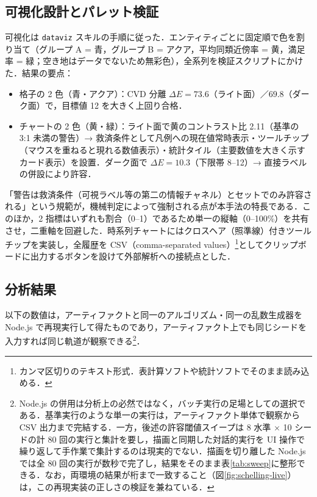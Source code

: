 \documentclass[a4paper]{jlreq}
\begin{document}
\subsection{可視化設計とパレット検証}\label{sec:palette}

可視化は \texttt{dataviz} スキルの手順に従った．エンティティごとに固定順で色を割り当て（グループ A = 青，グループ B = アクア，平均同類近傍率 = 黄，満足率 = 緑；空き地はデータでないため無彩色），全系列を検証スクリプトにかけた．結果の要点：

\begin{itemize}
  \item 格子の 2 色（青・アクア）：CVD 分離 $\Delta E = 73.6$（ライト面）／$69.8$（ダーク面）で，目標値 12 を大きく上回り合格．
  \item チャートの 2 色（黄・緑）：ライト面で黄のコントラスト比 2.11（基準の 3:1 未満の警告）→ 救済条件として凡例への現在値常時表示・ツールチップ（マウスを重ねると現れる数値表示）・統計タイル（主要数値を大きく示すカード表示）を設置．ダーク面で $\Delta E = 10.3$（下限帯 8--12）→ 直接ラベルの併設により許容．
\end{itemize}

「警告は救済条件（可視ラベル等の第二の情報チャネル）とセットでのみ許容される」という規範が，機械判定によって強制される点が本手法の特長である．このほか，2 指標はいずれも割合（0--1）であるため単一の縦軸（0--100\%）を共有させ，二重軸を回避した．時系列チャートにはクロスヘア（照準線）付きツールチップを実装し，全履歴を CSV（comma-separated values）\footnote{カンマ区切りのテキスト形式．表計算ソフトや統計ソフトでそのまま読み込める．}としてクリップボードに出力するボタンを設けて外部解析への接続点とした．

\subsection{分析結果}\label{sec:analysis}

以下の数値は，アーティファクトと同一のアルゴリズム・同一の乱数生成器を Node.js で再現実行して得たものであり，アーティファクト上でも同じシードを入力すれば同じ軌道が観察できる\footnote{Node.js の併用は分析上の必然ではなく，バッチ実行の足場としての選択である．基準実行のような単一の実行は，アーティファクト単体で観察から CSV 出力まで完結する．一方，後述の許容閾値スイープは 8 水準 $\times$ 10 シードの計 80 回の実行と集計を要し，描画と同期した対話的実行を UI 操作で繰り返して手作業で集計するのは現実的でない．描画を切り離した Node.js では全 80 回の実行が数秒で完了し，結果をそのまま表\ref{tab:sweep}に整形できる．なお，両環境の結果が桁まで一致すること（図\ref{fig:schelling-live}）は，この再現実装の正しさの検証を兼ねている．}．
\end{document}
